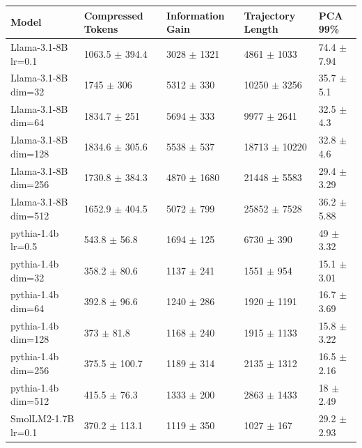 \begin{tabular}{lllll}
\toprule
 Model                          & Compressed Tokens           & Information Gain         & Trajectory Length          & PCA 99\%                  \\
\midrule
 Llama-3.1-8B {\small lr=0.1}   & 1063.5 {\small $\pm$ 394.4} & 3028 {\small $\pm$ 1321} & 4861 {\small $\pm$ 1033}   & 74.4 {\small $\pm$ 7.94} \\
 Llama-3.1-8B {\small dim=32}   & 1745 {\small $\pm$ 306}     & 5312 {\small $\pm$ 330}  & 10250 {\small $\pm$ 3256}  & 35.7 {\small $\pm$ 5.1}  \\
 Llama-3.1-8B {\small dim=64}   & 1834.7 {\small $\pm$ 251}   & 5694 {\small $\pm$ 333}  & 9977 {\small $\pm$ 2641}   & 32.5 {\small $\pm$ 4.3}  \\
 Llama-3.1-8B {\small dim=128}  & 1834.6 {\small $\pm$ 305.6} & 5538 {\small $\pm$ 537}  & 18713 {\small $\pm$ 10220} & 32.8 {\small $\pm$ 4.6}  \\
 Llama-3.1-8B {\small dim=256}  & 1730.8 {\small $\pm$ 384.3} & 4870 {\small $\pm$ 1680} & 21448 {\small $\pm$ 5583}  & 29.4 {\small $\pm$ 3.29} \\
 Llama-3.1-8B {\small dim=512}  & 1652.9 {\small $\pm$ 404.5} & 5072 {\small $\pm$ 799}  & 25852 {\small $\pm$ 7528}  & 36.2 {\small $\pm$ 5.88} \\
 \midrule
 pythia-1.4b {\small lr=0.5}    & 543.8 {\small $\pm$ 56.8}   & 1694 {\small $\pm$ 125}  & 6730 {\small $\pm$ 390}    & 49 {\small $\pm$ 3.32}   \\
 pythia-1.4b {\small dim=32}    & 358.2 {\small $\pm$ 80.6}   & 1137 {\small $\pm$ 241}  & 1551 {\small $\pm$ 954}    & 15.1 {\small $\pm$ 3.01} \\
 pythia-1.4b {\small dim=64}    & 392.8 {\small $\pm$ 96.6}   & 1240 {\small $\pm$ 286}  & 1920 {\small $\pm$ 1191}   & 16.7 {\small $\pm$ 3.69} \\
 pythia-1.4b {\small dim=128}   & 373 {\small $\pm$ 81.8}     & 1168 {\small $\pm$ 240}  & 1915 {\small $\pm$ 1133}   & 15.8 {\small $\pm$ 3.22} \\
 pythia-1.4b {\small dim=256}   & 375.5 {\small $\pm$ 100.7}  & 1189 {\small $\pm$ 314}  & 2135 {\small $\pm$ 1312}   & 16.5 {\small $\pm$ 2.16} \\
 pythia-1.4b {\small dim=512}   & 415.5 {\small $\pm$ 76.3}   & 1333 {\small $\pm$ 200}  & 2863 {\small $\pm$ 1433}   & 18 {\small $\pm$ 2.49}   \\
 \midrule
 SmolLM2-1.7B {\small lr=0.1}   & 370.2 {\small $\pm$ 113.1}  & 1119 {\small $\pm$ 350}  & 1027 {\small $\pm$ 167}    & 29.2 {\small $\pm$ 2.93} \\

\end{tabular}
